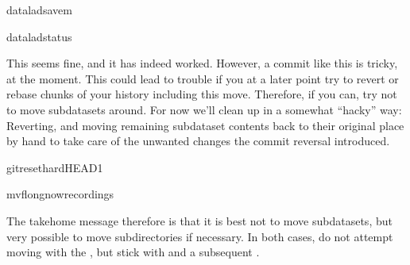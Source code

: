 \begin{sphinxVerbatim}[commandchars=\\\{\}]
dataladsave\PYGZhy{}m
\end{sphinxVerbatim}

\begin{sphinxVerbatim}[commandchars=\\\{\}]
dataladstatus
\end{sphinxVerbatim}

\sphinxAtStartPar
This seems fine, and it has indeed worked.
However,  a commit like this is tricky, at the moment. This could
lead to trouble if you at a later point try to revert or rebase chunks of your
history including this move. Therefore, if you can, try not to move subdatasets
around. For now we’ll clean up in a somewhat “hacky” way: Reverting, and
moving remaining subdataset contents back to their original place by hand
to take care of the unwanted changes the commit reversal introduced.

\begin{sphinxVerbatim}[commandchars=\\\{\}]
gitreset\PYGZhy{}\PYGZhy{}hardHEAD\PYGZti{}1
\end{sphinxVerbatim}

\begin{sphinxVerbatim}[commandchars=\\\{\}]
mv\PYGZhy{}flongnowrecordings
\end{sphinxVerbatim}

\sphinxAtStartPar
The take\sphinxhyphen{}home message therefore is that it is best not to move subdatasets,
but very possible to move subdirectories if necessary. In both cases, do not
attempt moving with the , but stick with  and
a subsequent .

